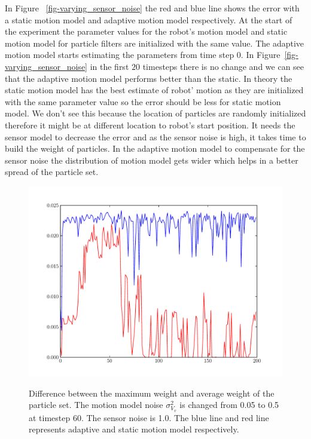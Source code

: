 \documentclass[12pt]{dalcsthesis}
\begin{document}
In Figure ~\ref{fig-varying_sensor_noise} the red and blue line shows the error with a static motion model and adaptive motion model respectively. At the start of the experiment the parameter values for the robot's motion model and static motion model for particle filters are initialized with the same value. The adaptive motion model starts estimating the parameters from time step 0. In Figure~\ref{fig-varying_sensor_noise} in the first $20$ timesteps there is no change and we can see that the adaptive motion model performs better than the static. In theory the static motion model has the best estimate of robot' motion as they are initialized with the same parameter value so the error should be less for static motion model. We don't see this because the location of particles are randomly initialized therefore it might be at different location to robot's start position. It needs the sensor model to decrease the error and as the sensor noise is high, it takes time to build the weight of particles. In the 
adaptive motion model to compensate for the sensor noise the distribution of motion model gets wider which helps in a better spread of the particle set.


\begin{figure}[!ht]
  \centering
     {\includegraphics[height = 3.0 in]{./plots/200_005_05_s_10_max_weight.pdf}}
  \caption{\label{fig-varying_sensor_noise_sensor_model_max_weight} Difference between the maximum weight and average weight of the particle set. The motion model noise $\sigma_{V_{v}}^{2}$ is changed from 0.05 to 0.5 at timestep 60. The sensor noise is 1.0. The blue line and red line represents adaptive and static motion model respectively. }
\end{figure}
\end{document}
